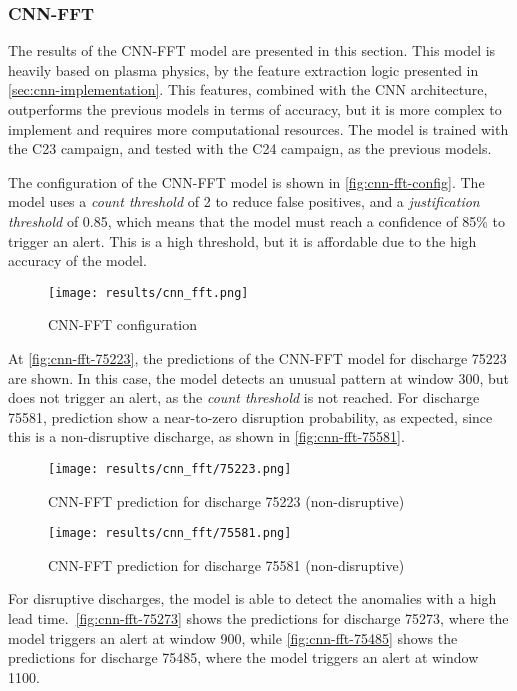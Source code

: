 \subsubsection{CNN-FFT}

The results of the CNN-FFT model are presented in this section. This model is heavily based on plasma physics, by the feature extraction logic presented in \autoref{sec:cnn-implementation}. This features, combined with the \ac{CNN} architecture, outperforms the previous models in terms of accuracy, but it is more complex to implement and requires more computational resources. The model is trained with the C23 campaign, and tested with the C24 campaign, as the previous models.

The configuration of the CNN-FFT model is shown in \autoref{fig:cnn-fft-config}. The model uses a \textit{count threshold} of 2 to reduce false positives, and a \textit{justification threshold} of 0.85, which means that the model must reach a confidence of 85\% to trigger an alert. This is a high threshold, but it is affordable due to the high accuracy of the model.

\begin{figure}[H]
    \centering
    \texttt{[image: results/cnn\_fft.png]}
    \caption{CNN-FFT configuration}
    \label{fig:cnn-fft-config}
\end{figure}

At \autoref{fig:cnn-fft-75223}, the predictions of the CNN-FFT model for discharge 75223 are shown. In this case, the model detects an unusual pattern at window 300, but does not trigger an alert, as the \textit{count threshold} is not reached. For discharge 75581, prediction show a near-to-zero disruption probability, as expected, since this is a non-disruptive discharge, as shown in \autoref{fig:cnn-fft-75581}.

\begin{figure}[H]
    \centering
    \texttt{[image: results/cnn\_fft/75223.png]}
    \caption{CNN-FFT prediction for discharge 75223 (non-disruptive)}
    \label{fig:cnn-fft-75223}
\end{figure}

\begin{figure}[H]
    \centering
    \texttt{[image: results/cnn\_fft/75581.png]}
    \caption{CNN-FFT prediction for discharge 75581 (non-disruptive)}
    \label{fig:cnn-fft-75581}
\end{figure}

For disruptive discharges, the model is able to detect the anomalies with a high lead time.\ \autoref{fig:cnn-fft-75273} shows the predictions for discharge 75273, where the model triggers an alert at window 900, while \autoref{fig:cnn-fft-75485} shows the predictions for discharge 75485, where the model triggers an alert at window 1100.

